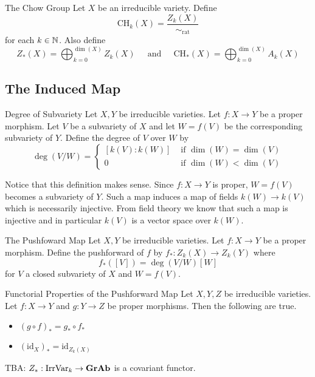 \documentclass[a4paper]{article}
\begin{document}
\begin{defn}{The Chow Group}{} Let $X$ be an irreducible variety. Define $$\text{CH}_k(X)=\frac{Z_k(X)}{\sim_\text{rat}}$$ for each $k\in\mathbb{N}$. Also define $$Z_\ast(X)=\bigoplus_{k=0}^{\dim(X)}Z_k(X)\;\;\;\;\text{ and }\;\;\;\;\text{CH}_\ast(X)=\bigoplus_{k=0}^{\dim(X)}A_k(X)$$
\end{defn}

\subsection{The Induced Map}
\begin{defn}{Degree of Subvariety}{} Let $X,Y$ be irreducible varieties. Let $f:X\to Y$ be a proper morphism. Let $V$ be a subvariety of $X$ and let $W=f(V)$ be the corresponding subvariety of $Y$. Define the degree of $V$ over $W$ by $$\deg(V/W)=\begin{cases}
[k(V):k(W)] & \text{ if } \dim(W)=\dim(V)\\
0 & \text{ if } \dim(W)<\dim(V)
\end{cases}$$
\end{defn}

Notice that this definition makes sense. Since $f:X\to Y$ is proper, $W=f(V)$ becomes a subvariety of $Y$. Such a map induces a map of fields $k(W)\to k(V)$ which is necessarily injective. From field theory we know that such a map is injective and in particular $k(V)$ is a vector space over $k(W)$. 

\begin{defn}{The Pushfoward Map}{} Let $X,Y$ be irreducible varieties. Let $f:X\to Y$ be a proper morphism. Define the pushforward of $f$ by $f_\ast:Z_k(X)\to Z_k(Y)$ where $$f_\ast([V])=\deg(V/W)[W]$$ for $V$ a closed subvariety of $X$ and $W=f(V)$. 
\end{defn}

\begin{lmm}{Functorial Properties of the Pushforward Map}{} Let $X,Y,Z$ be irreducible varieties. Let $f:X\to Y$ and $g:Y\to Z$ be proper morphisms. Then the following are true. 
\begin{itemize}
\item $(g\circ f)_\ast=g_\ast\circ f_\ast$
\item $(\text{id}_X)_\ast=\text{id}_{Z_k(X)}$
\end{itemize}
\end{lmm}

TBA: $Z_\ast:\text{IrrVar}_k\to\bold{GrAb}$ is a covariant functor. 
\end{document}
